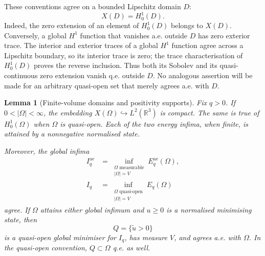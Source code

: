 \documentclass[11pt,a4paper]{article}
\newtheorem{lemma}[theorem]{Lemma}
\theoremstyle{definition}
\theoremstyle{remark}
\begin{document}
These conventions agree on a bounded Lipschitz domain $D$:
\begin{equation}
 X(D)=H^1_0(D).
 \label{eq:global-lipschitz-support}
\end{equation}
Indeed, the zero extension of an element of $H^1_0(D)$ belongs to
$X(D)$.  Conversely, a global $H^1$ function that vanishes a.e. outside
$D$ has zero exterior trace.  The interior and exterior traces of a
global $H^1$ function agree across a Lipschitz boundary, so its interior
trace is zero; the trace characterisation of $H^1_0(D)$ proves the
reverse inclusion.  Thus both its Sobolev and its quasi-continuous zero
extension vanish q.e. outside $D$.  No analogous assertion will be made
for an arbitrary quasi-open set that merely agrees a.e. with $D$.

\begin{lemma}[Finite-volume domains and positivity supports]
\label{lem:measurable}
Fix $q>0$.  If $0<|\Omega|<\infty$, the embedding
$X(\Omega)\hookrightarrow L^2(\mathbb R^3)$ is compact.  The same is
true of $H^1_0(\Omega)$ when $\Omega$ is quasi-open.  Each of the two
energy infima, when finite, is attained by a nonnegative normalised
state.

Moreover, the global infima
\begin{equation}
 \begin{split}
 I_q^{\mathrm{ae}}&=
   \inf_{\substack{\Omega\text{ measurable}\\|\Omega|=V}}
           E_q^{\mathrm{ae}}(\Omega),\\
 I_q&=\inf_{\substack{\Omega\text{ quasi-open}\\|\Omega|=V}}
           E_q(\Omega)
 \end{split}
 \label{eq:global-infima}
\end{equation}
agree.  If $\Omega$ attains either global infimum and $u\geq0$ is a
normalised minimising state, then
\[
 Q=\{\widetilde u>0\}
\]
is a quasi-open global minimiser for $I_q$, has measure $V$, and agrees
a.e. with $\Omega$.  In the quasi-open convention, $Q\subset\Omega$
q.e. as well.
\end{lemma}
\end{document}
